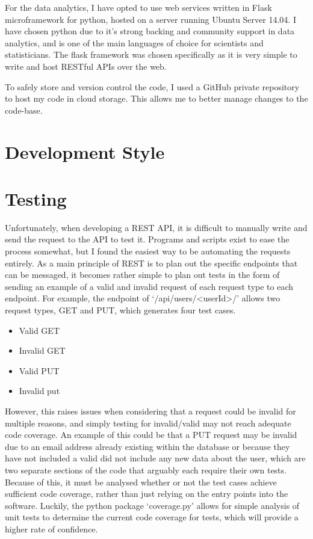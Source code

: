 For the data analytics, I have opted to use web services written in Flask microframework for python, hosted on a server running Ubuntu Server 14.04. 
I have chosen python due to it's strong backing and community support in data analytics, and is one of the main languages of choice for scientists and statisticians.
The flask framework was chosen specifically as it is very simple to write and host RESTful APIs over the web.

To safely store and version control the code, I used a GitHub private repository to host my code in cloud storage. 
This allows me to better manage changes to the code-base. 

\section{Development Style}

\section{Testing}
Unfortunately, when developing a REST API, it is difficult to manually write and send the request to the API to test it.
Programs and scripts exist to ease the process somewhat, but I found the easiest way to be automating the requests entirely. 
As a main principle of REST is to plan out the specific endpoints that can be messaged, it becomes rather simple to plan out tests in the form of sending an example of a valid and invalid request of each request type to each endpoint.
For example, the endpoint of `/api/users/<userId>/' allows two request types, GET and PUT, which generates four test cases.
\begin{itemize}
	\item{Valid GET}
	\item{Invalid GET}
	\item{Valid PUT}
	\item{Invalid put}
\end{itemize}  
However, this raises issues when considering that a request could be invalid for multiple reasons, and simply testing for invalid/valid may not reach adequate code coverage.
An example of this could be that a PUT request may be invalid due to an email address already existing within the database or because they have not included a valid did not include any new data about the user, which are two separate sections of the code that arguably each require their own tests.
Because of this, it must be analysed whether or not the test cases achieve sufficient code coverage, rather than just relying on the entry points into the software.
Luckily, the python package `coverage.py' allows for simple analysis of unit tests to determine the current code coverage for tests, which will provide a higher rate of confidence.

